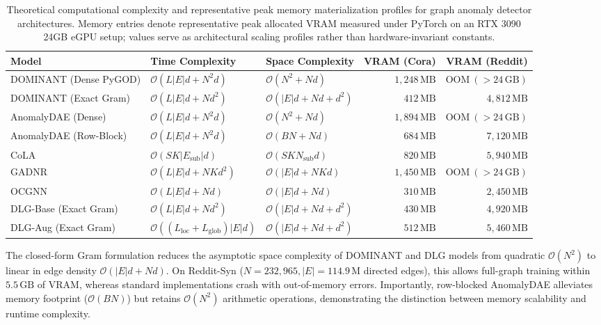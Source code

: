 \documentclass[applsci,article,submit,moreauthors,pdftex]{Definitions/mdpi}
\begin{document}
\begin{table}[htbp]
\centering\footnotesize\setlength{\tabcolsep}{3pt}
\caption{Theoretical computational complexity and representative peak memory materialization profiles for graph anomaly detector architectures. Memory entries denote representative peak allocated VRAM measured under PyTorch on an RTX 3090 24GB eGPU setup; values serve as architectural scaling profiles rather than hardware-invariant constants.}
\label{tab:complexity_comparison}
\begin{tabularx}{\textwidth}{lXXrr}\toprule
\textbf{Model} & \textbf{Time Complexity} & \textbf{Space Complexity} & \textbf{VRAM (Cora)} & \textbf{VRAM (Reddit)} \\\midrule
DOMINANT (Dense PyGOD) & $\mathcal{O}(L |E| d + N^2 d)$ & $\mathcal{O}(N^2 + N d)$ & $1,248\,\mathrm{MB}$ & $\mathrm{OOM}\ (>24\,\mathrm{GB})$ \\
DOMINANT (Exact Gram) & $\mathcal{O}(L |E| d + N d^2)$ & $\mathcal{O}(|E| d + N d + d^2)$ & $412\,\mathrm{MB}$ & $4,812\,\mathrm{MB}$ \\
AnomalyDAE (Dense) & $\mathcal{O}(L |E| d + N^2 d)$ & $\mathcal{O}(N^2 + N d)$ & $1,894\,\mathrm{MB}$ & $\mathrm{OOM}\ (>24\,\mathrm{GB})$ \\
AnomalyDAE (Row-Block) & $\mathcal{O}(L |E| d + N^2 d)$ & $\mathcal{O}(B N + N d)$ & $684\,\mathrm{MB}$ & $7,120\,\mathrm{MB}$ \\
CoLA & $\mathcal{O}(S K |E_{\mathrm{sub}}| d)$ & $\mathcal{O}(S K N_{\mathrm{sub}} d)$ & $820\,\mathrm{MB}$ & $5,940\,\mathrm{MB}$ \\
GADNR & $\mathcal{O}(L |E| d + N K d^2)$ & $\mathcal{O}(|E| d + N K d)$ & $1,450\,\mathrm{MB}$ & $\mathrm{OOM}\ (>24\,\mathrm{GB})$ \\
OCGNN & $\mathcal{O}(L |E| d + N d)$ & $\mathcal{O}(|E| d + N d)$ & $310\,\mathrm{MB}$ & $2,450\,\mathrm{MB}$ \\
DLG-Base (Exact Gram) & $\mathcal{O}(L |E| d + N d^2)$ & $\mathcal{O}(|E| d + N d + d^2)$ & $430\,\mathrm{MB}$ & $4,920\,\mathrm{MB}$ \\
DLG-Aug (Exact Gram) & $\mathcal{O}((L_{\mathrm{loc}} + L_{\mathrm{glob}}) |E| d)$ & $\mathcal{O}(|E| d + N d + d^2)$ & $512\,\mathrm{MB}$ & $5,460\,\mathrm{MB}$ \\\bottomrule
\end{tabularx}
\end{table}

The closed-form Gram formulation reduces the asymptotic space complexity of DOMINANT and DLG models from quadratic $\mathcal{O}(N^2)$ to linear in edge density $\mathcal{O}(|E| d + N d)$. On Reddit-Syn ($N=232,965, |E|=114.9\,\mathrm{M}$ directed edges), this allows full-graph training within $5.5\,\mathrm{GB}$ of VRAM, whereas standard implementations crash with out-of-memory errors. Importantly, row-blocked AnomalyDAE alleviates memory footprint ($\mathcal{O}(B N)$) but retains $\mathcal{O}(N^2)$ arithmetic operations, demonstrating the distinction between memory scalability and runtime complexity.
\end{document}
